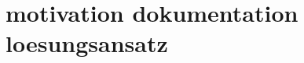 \section{motivation dokumentation loesungsansatz}\label{sec:03_motivation_dokumentation_loesungsansatz}
